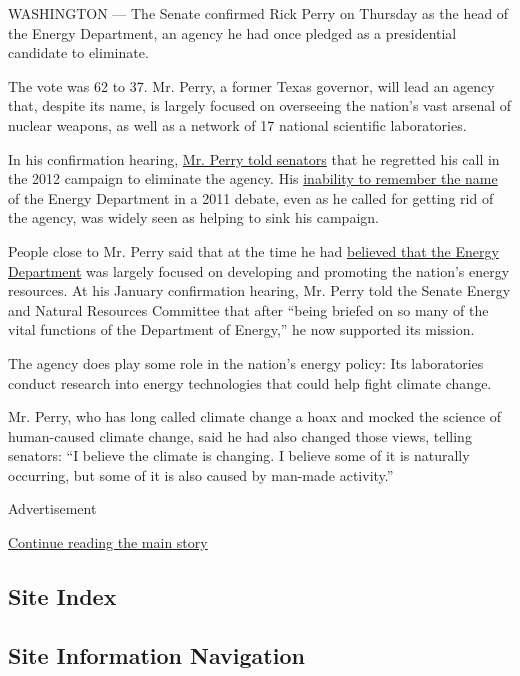 WASHINGTON --- The Senate confirmed Rick Perry on Thursday as the head
of the Energy Department, an agency he had once pledged as a
presidential candidate to eliminate.

The vote was 62 to 37. Mr. Perry, a former Texas governor, will lead an
agency that, despite its name, is largely focused on overseeing the
nation's vast arsenal of nuclear weapons, as well as a network of 17
national scientific laboratories.

In his confirmation hearing,
\href{https://www.nytimes.com/2017/01/19/us/politics/rick-perry-energy-department.html}{Mr.
Perry told senators} that he regretted his call in the 2012 campaign to
eliminate the agency. His
\href{https://www.youtube.com/watch?v=0uvmKnFY4uk}{inability to remember
the name} of the Energy Department in a 2011 debate, even as he called
for getting rid of the agency, was widely seen as helping to sink his
campaign.

People close to Mr. Perry said that at the time he had
\href{https://www.nytimes.com/2017/01/18/us/politics/rick-perry-energy-secretary-donald-trump.html}{believed
that the Energy Department} was largely focused on developing and
promoting the nation's energy resources. At his January confirmation
hearing, Mr. Perry told the Senate Energy and Natural Resources
Committee that after ``being briefed on so many of the vital functions
of the Department of Energy,'' he now supported its mission.

The agency does play some role in the nation's energy policy: Its
laboratories conduct research into energy technologies that could help
fight climate change.

Mr. Perry, who has long called climate change a hoax and mocked the
science of human-caused climate change, said he had also changed those
views, telling senators: ``I believe the climate is changing. I believe
some of it is naturally occurring, but some of it is also caused by
man-made activity.''

Advertisement

\protect\hyperlink{after-bottom}{Continue reading the main story}

\hypertarget{site-index}{%
\subsection{Site Index}\label{site-index}}

\hypertarget{site-information-navigation}{%
\subsection{Site Information
Navigation}\label{site-information-navigation}}

